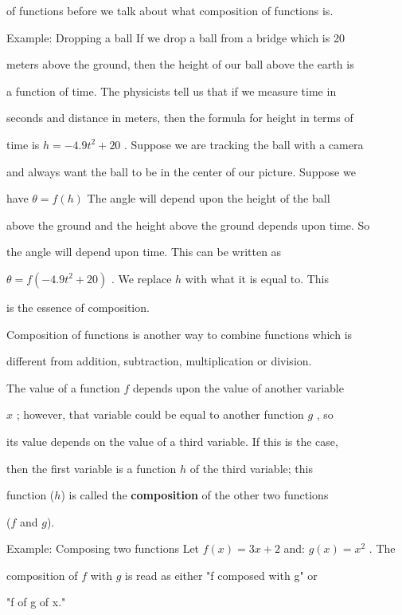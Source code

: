 of functions before we talk about what composition of functions is.



Example: Dropping a ball If we drop a ball from a bridge which is 20

meters above the ground, then the height of our ball above the earth is

a function of time. The physicists tell us that if we measure time in

seconds and distance in meters, then the formula for height in terms of

time is $h=-4.9t^2+20$ . Suppose we are tracking the ball with a camera

and always want the ball to be in the center of our picture. Suppose we

have $\theta=f(h)$ The angle will depend upon the height of the ball

above the ground and the height above the ground depends upon time. So

the angle will depend upon time. This can be written as

$\theta=f(-4.9t^2+20)$ . We replace $h$ with what it is equal to. This

is the essence of composition.



Composition of functions is another way to combine functions which is

different from addition, subtraction, multiplication or division.



The value of a function $f$ depends upon the value of another variable

$x$ ; however, that variable could be equal to another function $g$ , so

its value depends on the value of a third variable. If this is the case,

then the first variable is a function $h$ of the third variable; this

function ($h$) is called the \textbf{composition} of the other two functions

($f$ and $g$).



Example: Composing two functions Let $f(x)=3x+2$ and: $g(x)=x^2$ . The

composition of $f$ with $g$ is read as either "f composed with g" or

"f of g of x."



